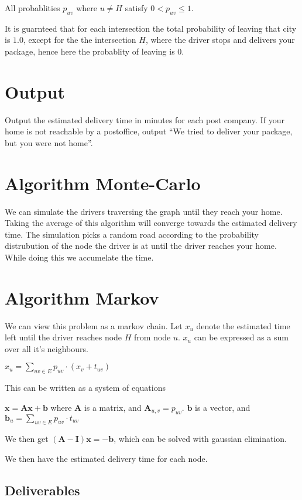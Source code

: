 \documentclass{tufte-handout}
\begin{document}
\medskip

All probablities $p_{uv}$ where $u \neq H$ satisfy $0 < p_{uv} \leq 1$.

It is guarnteed that for each intersection the total probability of leaving that city is $1.0$,
except for the the intersection $H$, where the driver stops and delivers your package, 
hence here the probablity of leaving is $0$.

\section*{Output}
Output the estimated delivery time in minutes for each post company.
If your home is not reachable by a postoffice, output ``We tried to deliver your package, but you were not home''.


\section*{Algorithm Monte-Carlo}
We can simulate the drivers traversing the graph until they reach your home.
Taking the average of this algorithm will converge towards the estimated delivery time.
The simulation picks a random road according to the probability distrubution 
of the node the driver is at until the driver reaches your home. While doing this we accumelate the time.


\section*{Algorithm Markov}
We can view this problem as a markov chain. 
Let $x_u$ denote the estimated time left until the driver reaches node $H$ from node $u$.
$x_u$ can be expressed as a sum over all it's neighbours.

$x_u = \sum_{uv \in E}{p_{uv}\cdot (x_v + t_{uv})}$

This can be written as a system of equations

$\bm{x} = \bm{Ax} + \bm{b}$
where $\bm{A}$ is a matrix, and $\bm{A}_{u,v} = p_{uv}$. $\bm{b}$ is a vector, and $\bm{b}_u = \sum_{uv \in E}{p_{uv}\cdot t_{uv}}$

We then get $(\bm{A}-\bm{I})\bm{x} = -\bm{b}$, which can be solved with gaussian elimination.

We then have the estimated delivery time for each node.

\subsection{Deliverables}
\end{document}

